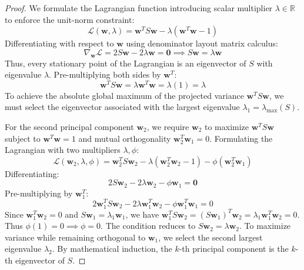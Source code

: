 \begin{proof}
We formulate the Lagrangian function introducing scalar multiplier $\lambda \in \mathbb{R}$ to enforce the unit-norm constraint:
\begin{equation}
\mathcal{L}(\mathbf{w}, \lambda) = \mathbf{w}^T S \mathbf{w} - \lambda (\mathbf{w}^T \mathbf{w} - 1)
\end{equation}
Differentiating with respect to $\mathbf{w}$ using denominator layout matrix calculus:
\begin{equation}
\nabla_{\mathbf{w}} \mathcal{L} = 2S\mathbf{w} - 2\lambda \mathbf{w} = \mathbf{0} \implies S\mathbf{w} = \lambda \mathbf{w}
\label{eq:pca_lagrange_condition}
\end{equation}
Thus, every stationary point of the Lagrangian is an eigenvector of $S$ with eigenvalue $\lambda$. Pre-multiplying both sides by $\mathbf{w}^T$:
\begin{equation}
\mathbf{w}^T S \mathbf{w} = \lambda \mathbf{w}^T \mathbf{w} = \lambda (1) = \lambda
\end{equation}
To achieve the absolute global maximum of the projected variance $\mathbf{w}^T S \mathbf{w}$, we must select the eigenvector associated with the largest eigenvalue $\lambda_1 = \lambda_{\max}(S)$.

For the second principal component $\mathbf{w}_2$, we require $\mathbf{w}_2$ to maximize $\mathbf{w}^T S \mathbf{w}$ subject to $\mathbf{w}^T \mathbf{w} = 1$ and mutual orthogonality $\mathbf{w}_2^T \mathbf{w}_1 = 0$. Formulating the Lagrangian with two multipliers $\lambda, \phi$:
\begin{equation}
\mathcal{L}(\mathbf{w}_2, \lambda, \phi) = \mathbf{w}_2^T S \mathbf{w}_2 - \lambda (\mathbf{w}_2^T \mathbf{w}_2 - 1) - \phi (\mathbf{w}_2^T \mathbf{w}_1)
\end{equation}
Differentiating:
\begin{equation}
2S\mathbf{w}_2 - 2\lambda \mathbf{w}_2 - \phi \mathbf{w}_1 = \mathbf{0}
\end{equation}
Pre-multiplying by $\mathbf{w}_1^T$:
\begin{equation}
2\mathbf{w}_1^T S \mathbf{w}_2 - 2\lambda \mathbf{w}_1^T \mathbf{w}_2 - \phi \mathbf{w}_1^T \mathbf{w}_1 = 0
\end{equation}
Since $\mathbf{w}_1^T \mathbf{w}_2 = 0$ and $S\mathbf{w}_1 = \lambda_1 \mathbf{w}_1$, we have $\mathbf{w}_1^T S \mathbf{w}_2 = (S\mathbf{w}_1)^T \mathbf{w}_2 = \lambda_1 \mathbf{w}_1^T \mathbf{w}_2 = 0$. Thus $\phi (1) = 0 \implies \phi = 0$.
The condition reduces to $S\mathbf{w}_2 = \lambda \mathbf{w}_2$. To maximize variance while remaining orthogonal to $\mathbf{w}_1$, we select the second largest eigenvalue $\lambda_2$. By mathematical induction, the $k$-th principal component is the $k$-th eigenvector of $S$.
\end{proof}

